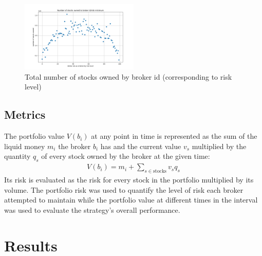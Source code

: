 \documentclass[letterpaper, 11 pt, proceedings]{IEEEtran}
\begin{document}
	\begin{figure}[h]
		\centering
		\includegraphics[width=0.5\textwidth]{stocksOwnedToBrokerIds.png}
		\caption{Total number of stocks owned by broker id (corresponding to risk level)}
		\label{totalvID}
	\end{figure}

	
	\subsection{Metrics}\label{subsec:metrics}	
	The portfolio value $V(b_i)$ at any point in time is represented as the sum of the liquid money $m_i$ the broker $b_i$ has and the current value $v_s$ multiplied by the quantity $q_s$ of every stock owned by the broker at the given time: 
	\begin{align}
		V(b_i) = m_i + \sum\limits_{s\in\text{stocks}} v_s q_s\label{eq:portfolio_value}
	\end{align}
	Its risk is evaluated as the risk for every stock in the portfolio multiplied by its volume. The portfolio risk was used to quantify the level of risk each broker attempted to maintain while the portfolio value at different times in the interval was used to evaluate the strategy's overall performance.


	\section{Results}\label{sec:results}
		
	
\end{document}

